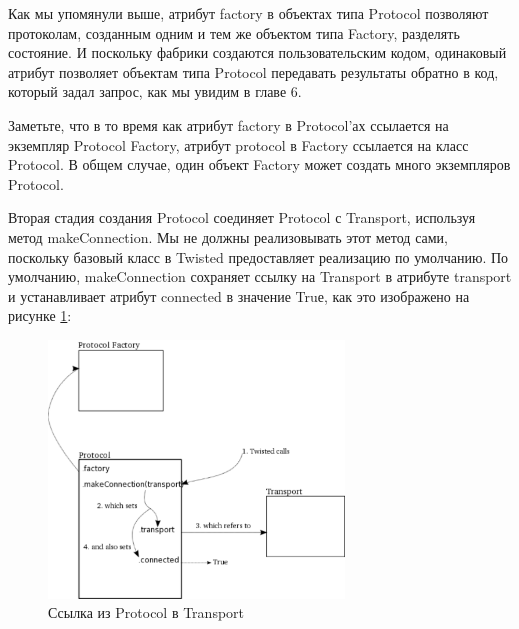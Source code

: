
Как мы упомянули выше, атрибут factory в объектах 
типа Protocol позволяют протоколам, созданным одним 
и тем же объектом типа Factory, разделять состояние. И 
поскольку фабрики создаются пользовательским кодом, 
одинаковый атрибут позволяет объектам типа Protocol 
передавать результаты обратно в код, который задал запрос,  
как мы увидим в главе 6. 


Заметьте, что в то время как атрибут factory в 
Protocol'ах ссылается на экземпляр Protocol Factory, 
атрибут protocol в Factory ссылается на класс Protocol. 
В общем случае, один объект Factory может создать 
много экземпляров Protocol.


Вторая стадия создания Protocol соединяет Protocol с 
Transport, используя метод makeConnection. Мы не должны 
реализовывать этот метод сами, поскольку базовый класс в 
Twisted предоставляет реализацию по умолчанию. По умолчанию, 
makeConnection сохраняет ссылку на Transport в атрибуте 
transport и устанавливает атрибут connected в значение Truе, 
как это изображено на рисунке \ref{fig:protocols-2}:

\begin{figure}[h]
\begin{center}
    \includegraphics[width=0.7\textwidth]{images/protocols-2.pdf}
    \caption{Ссылка из Protocol в Transport\label{fig:protocols-2}}
\end{center}
\end{figure}


